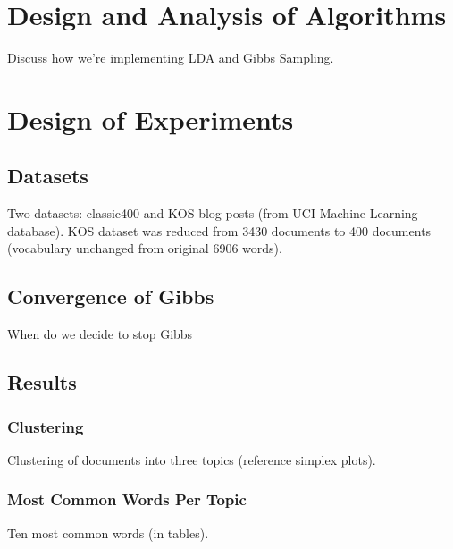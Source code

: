 \documentclass[10pt]{article}
\begin{document}
\section{Design and Analysis of Algorithms}
\label{sec:algorithms}

Discuss how we're implementing LDA and Gibbs Sampling.



\section{Design of Experiments}
\label{sec:experiments}

%
%
\subsection{Datasets}
Two datasets: classic400 and KOS blog posts (from UCI Machine Learning database). KOS dataset was reduced from 3430 documents to 400 documents (vocabulary unchanged from original 6906 words).

%
%
\subsection{Convergence of Gibbs}
When do we decide to stop Gibbs


%
%
\subsection{Results}

\subsubsection{Clustering}
Clustering of documents into three topics (reference simplex plots).

\subsubsection{Most Common Words Per Topic}
Ten most common words (in tables).
\end{document}
